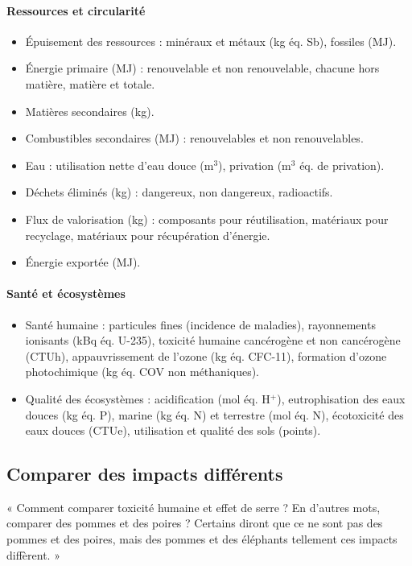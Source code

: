 \paragraph{Ressources et circularité}
\begin{itemize}
  \item Épuisement des ressources : minéraux et métaux (kg éq. Sb), fossiles (MJ).
  \item Énergie primaire (MJ) : renouvelable et non renouvelable, chacune hors matière, matière et totale.
  \item Matières secondaires (kg).
  \item Combustibles secondaires (MJ) : renouvelables et non renouvelables.
  \item Eau : utilisation nette d'eau douce (m$^3$), privation (m$^3$ éq. de privation).
  \item Déchets éliminés (kg) : dangereux, non dangereux, radioactifs.
  \item Flux de valorisation (kg) : composants pour réutilisation, matériaux pour recyclage, matériaux pour récupération d'énergie.
  \item Énergie exportée (MJ).
\end{itemize}

\paragraph{Santé et écosystèmes}
\begin{itemize}
  \item Santé humaine : particules fines (incidence de maladies), rayonnements ionisants (kBq éq. U-235), toxicité humaine cancérogène et non cancérogène (CTUh), appauvrissement de l'ozone (kg éq. CFC-11), formation d'ozone photochimique (kg éq. COV non méthaniques).
  \item Qualité des écosystèmes : acidification (mol éq. H$^+$), eutrophisation des eaux douces (kg éq. P), marine (kg éq. N) et terrestre (mol éq. N), écotoxicité des eaux douces (CTUe), utilisation et qualité des sols (points).
\end{itemize}

\subsection*{Comparer des impacts différents}

\begin{displayquote}
« Comment comparer toxicité humaine et effet de serre ? En d'autres mots, comparer des pommes et des poires ? Certains diront que ce ne sont pas des pommes et des poires, mais des pommes et des éléphants tellement ces impacts diffèrent. »
\end{displayquote}

